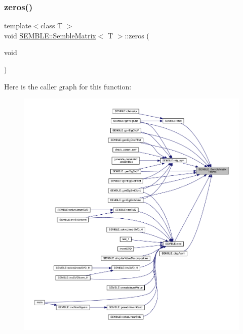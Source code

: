 \subsubsection{\texorpdfstring{zeros()}{zeros()}\hspace{0.1cm}{\footnotesize\ttfamily [1/2]}}
{\footnotesize\ttfamily template$<$class T $>$ \\
void \mbox{\hyperlink{structSEMBLE_1_1SembleMatrix}{S\+E\+M\+B\+L\+E\+::\+Semble\+Matrix}}$<$ T $>$\+::zeros (\begin{DoxyParamCaption}\item[{void}]{ }\end{DoxyParamCaption})}

Here is the caller graph for this function\+:
\nopagebreak
\begin{figure}[H]
\begin{center}
\leavevmode
\includegraphics[width=350pt]{df/d87/structSEMBLE_1_1SembleMatrix_a1b6d5a9a3816e9d98eb55a71a5fa1a5f_icgraph}
\end{center}
\end{figure}
\mbox{\label{structSEMBLE_1_1SembleMatrix_a1b6d5a9a3816e9d98eb55a71a5fa1a5f}} 
